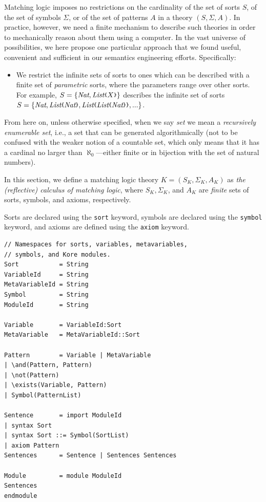 \documentclass[UTF8,11pt]{article}
\theoremstyle{plain}
\theoremstyle{definition}
\theoremstyle{remark}
\newcommand{\Nat}{\textit{Nat}}
\newcommand{\List}{\textit{List}}
\newcommand{\parametric}[2]{{#1}\raisebox{.2ex}{\texttt{\footnotesize{\{}}}#2\raisebox{.2ex}{\texttt{\footnotesize{\}}}}}
\newcommand{\smalltt}[1]{\texttt{\small #1} }
\newcommand{\sort}{\smalltt{sort}}
\newcommand{\symb}{\smalltt{symbol}}
\newcommand{\axiom}{\smalltt{axiom}}
\begin{document}
Matching logic imposes no restrictions on the cardinality of the set of
sorts $S$, of the set of symbols $\Sigma$, or of the set of patterns $A$
in a theory $(S,\Sigma,A)$.
In practice, however, we need a finite mechanism to describe such theories
in order to mechanically reason about them using a computer.
In the vast universe of possibilities, we here propose one particular approach
that we found useful, convenient and sufficient in our semantics engineering
efforts.
Specifically:
\begin{itemize}
	\item
	We restrict the infinite sets of sorts to ones which can be described with
	a finite set of \emph{parametric} sorts, where the parameters range over
	other sorts.
	For example, $S=\{\Nat,\parametric{\List}{X}\}$ describes the infinite set
	of sorts
	$S=\{\Nat, \parametric{\List}{\Nat}, 
	\parametric{\List}{\parametric{\List}{\Nat}}, ...\}$.
	
\end{itemize}

From here on, unless otherwise specified, when we say \emph{set} we mean
a \emph{recursively enumerable set}, i.e., a set that can be generated
algorithmically (not to be confused with the weaker notion of a
countable
set, which only means that it has a cardinal no larger than
$\aleph_0$---either finite or in bijection with the set
of natural numbers).


In this section, we define a matching logic theory $K = (S_K, \Sigma_K, A_K)$ 
as \emph{the (reflective) calculus of matching logic},
where $S_K, \Sigma_K$, and $A_K$ are \emph{finite} sets of sorts,
symbols, and axioms,  respectively.

Sorts are declared using the \sort keyword, symbols are declared using the 
\symb keyword, and axioms are defined using the \axiom keyword.

\begin{Verbatim}[fontsize=\small]
// Namespaces for sorts, variables, metavariables,
// symbols, and Kore modules.
Sort           = String
VariableId     = String
MetaVariableId = String
Symbol         = String
ModuleId       = String

Variable       = VariableId:Sort
MetaVariable   = MetaVariableId::Sort

Pattern        = Variable | MetaVariable
| \and(Pattern, Pattern)
| \not(Pattern)
| \exists(Variable, Pattern)
| Symbol(PatternList)

Sentence       = import ModuleId
| syntax Sort
| syntax Sort ::= Symbol(SortList)
| axiom Pattern
Sentences      = Sentence | Sentences Sentences

Module         = module ModuleId
Sentences
endmodule
\end{Verbatim}
\end{document}
